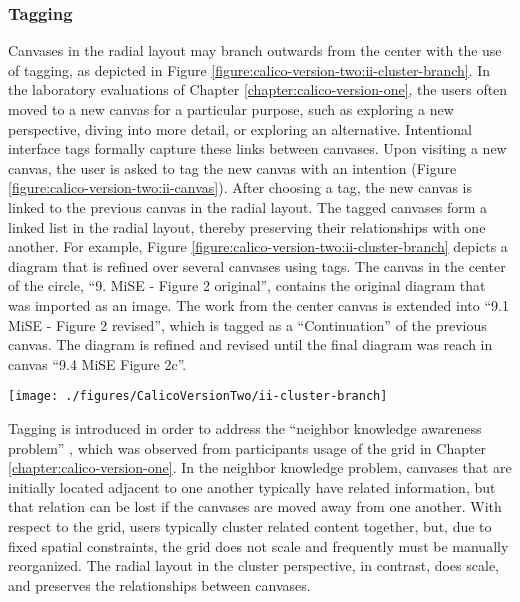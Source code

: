 \subsubsection{Tagging} 

Canvases in the radial layout may branch outwards from the center with the use of tagging, as depicted in Figure \ref{figure:calico-version-two:ii-cluster-branch}. In the laboratory evaluations of Chapter \ref{chapter:calico-version-one}, the users often moved to a new canvas for a particular purpose, such as exploring a new perspective, diving into more detail, or exploring an alternative. Intentional interface tags formally capture these links between canvases. Upon visiting a new canvas, the user is asked to tag the new canvas with an intention (Figure \ref{figure:calico-version-two:ii-canvas}). After choosing a tag, the new canvas is linked to the previous canvas in the radial layout. The tagged canvases form a linked list in the radial layout, thereby preserving their relationships with one another. For example, Figure \ref{figure:calico-version-two:ii-cluster-branch} depicts a diagram that is refined over several canvases using tags. The canvas in the center of the circle, ``9. MiSE - Figure 2 original'', contains the original diagram that was imported as an image. The work from the center canvas is extended into ``9.1 MiSE - Figure 2 revised'', which is tagged as a ``Continuation'' of the previous canvas. The diagram is refined and revised until the final diagram was reach in canvas ``9.4 MiSE Figure 2c''.

\begin{figure*}[tbh]
  \centering
  \texttt{[image: ./figures/CalicoVersionTwo/ii-cluster-branch]}
  \caption{A diagram is refined and revised across several canvases, which are linked with ``Continuation'' and ``Alternative'' tags.}
  \label{figure:calico-version-two:ii-cluster-branch}
\end{figure*}


Tagging is introduced in order to address the ``neighbor knowledge awareness problem'' \cite{dekel2007notation}, which was observed from participants usage of the grid in Chapter \ref{chapter:calico-version-one}. In the neighbor knowledge problem, canvases that are initially located adjacent to one another typically have related information, but that relation can be lost if the canvases are moved away from one another. With respect to the grid, users typically cluster related content together, but, due to fixed spatial constraints, the grid does not scale and frequently must be manually reorganized. The radial layout in the cluster perspective, in contrast, does scale, and preserves the relationships between canvases. 

